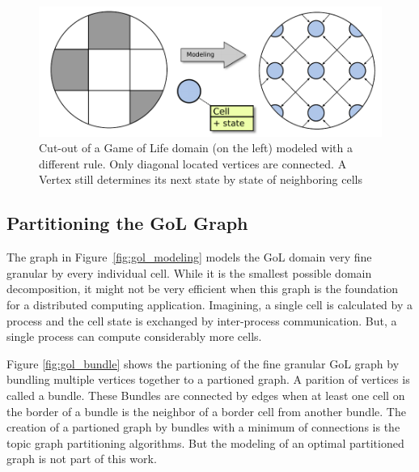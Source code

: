 \begin{figure}[H]
  \centering \includegraphics[width=\textwidth]{graphics/30_gol_modeling_changed}
  \caption{Cut-out of a Game of Life domain (on the left) modeled
    with a different rule. Only diagonal located vertices are connected.
  A Vertex still determines its next state by state of neighboring cells}
  \label{fig:gol_modeling_changed}
\end{figure}


\subsection{Partitioning the GoL Graph}
The graph in Figure~\ref{fig:gol_modeling} models the GoL domain very fine
granular by every individual cell. While it is the smallest possible
domain decomposition, it might not be very efficient when this graph
is the foundation for a distributed computing application. Imagining, a
single cell is calculated by a process and the cell state is exchanged
by inter-process communication. But, a single process can compute
considerably more cells.

Figure \ref{fig:gol_bundle} shows the partioning of the fine granular
GoL graph by bundling multiple vertices together to a partioned
graph. A parition of vertices is called a bundle. These Bundles are
connected by edges when at least one cell on the border of a bundle
is the neighbor of a border cell from another bundle.  The creation of
a partioned graph by bundles with a minimum of connections is the
topic graph partitioning algorithms. But the modeling of an optimal
partitioned graph is not part of this work.

